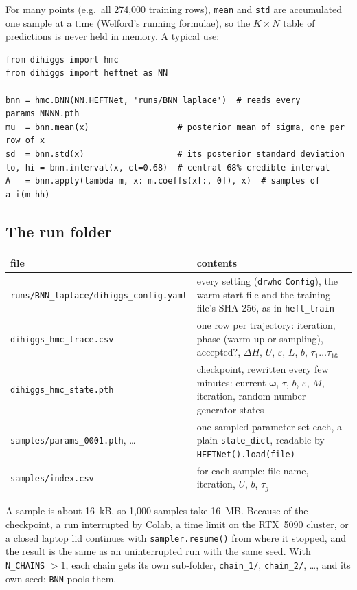 \documentclass[11pt]{article}
\newcommand{\file}[1]{\nolinkurl{#1}}
\newcommand{\code}[1]{\texttt{#1}}
\newcommand{\bw}{\boldsymbol{\omega}}
\begin{document}
\noindent For many points (e.g.\ all 274,000 training rows), \code{mean} and
\code{std} are accumulated one sample at a time (Welford's running formulae), so the
$K \times N$ table of predictions is never held in memory. A typical use:

\begin{lstlisting}
from dihiggs import hmc
from dihiggs import heftnet as NN

bnn = hmc.BNN(NN.HEFTNet, 'runs/BNN_laplace')  # reads every params_NNNN.pth
mu  = bnn.mean(x)                  # posterior mean of sigma, one per row of x
sd  = bnn.std(x)                   # its posterior standard deviation
lo, hi = bnn.interval(x, cl=0.68)  # central 68% credible interval
A   = bnn.apply(lambda m, x: m.coeffs(x[:, 0]), x)  # samples of a_i(m_hh)
\end{lstlisting}

\subsection{The run folder}
\label{sec:runfolder}

\begin{center}
\small
\begin{tabular}{p{}p{}}
\toprule
file & contents\\
\midrule
\file{runs/BNN_laplace/dihiggs_config.yaml} & every setting (\code{drwho} \code{Config}),
  the warm-start file and the training file's SHA-256, as in \file{heft_train}\\
\file{dihiggs_hmc_trace.csv} & one row per trajectory: iteration, phase (warm-up or
  sampling), accepted?, $\Delta H$, $U$, $\varepsilon$, $L$, $b$, $\tau_1 \ldots \tau_{16}$\\
\file{dihiggs_hmc_state.pth} & checkpoint, rewritten every few minutes: current $\bw$,
  $\tau$, $b$, $\varepsilon$, $M$, iteration, random-number-generator states\\
\file{samples/params_0001.pth}, \ldots & one sampled parameter set each, a plain
  \code{state\_dict}, readable by \code{HEFTNet().load(file)}\\
\file{samples/index.csv} & for each sample: file name, iteration, $U$, $b$, $\tau_g$\\
\bottomrule
\end{tabular}
\end{center}

\noindent A sample is about 16~kB, so 1,000 samples take 16~MB. Because of the
checkpoint, a run interrupted by Colab, a time limit on the RTX~5090 cluster, or a
closed laptop lid continues with \code{sampler.resume()} from where it stopped, and
the result is the same as an uninterrupted run with the same seed. With
\code{N\_CHAINS} $> 1$, each chain gets its own sub-folder, \file{chain_1/},
\file{chain_2/}, \ldots, and its own seed; \code{BNN} pools them.
\end{document}
